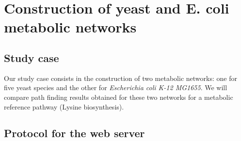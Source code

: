 \section{Construction of yeast and E. coli metabolic networks}

\subsection{Study case}

Our study case consists in the construction of two metabolic networks:
one for five yeast species and the other for \textit{Escherichia coli
  K-12 MG1655}.  We will compare path finding results obtained for
these two networks for a metabolic reference pathway (Lysine
biosynthesis).

\subsection{Protocol for the web server}

